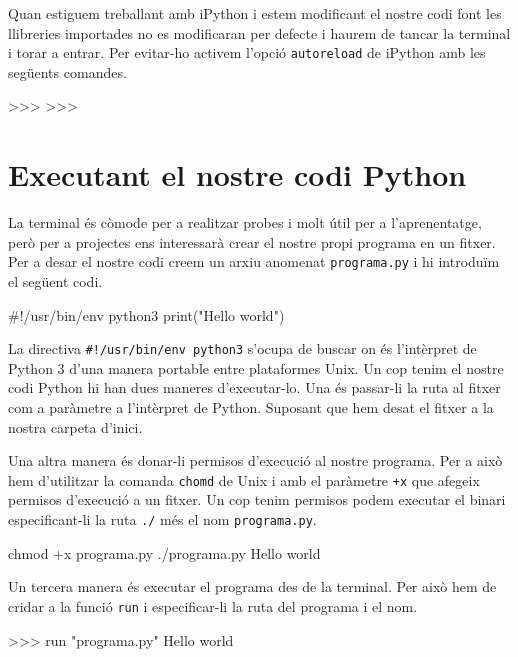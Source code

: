 Quan estiguem treballant amb iPython i estem modificant el nostre codi font les llibreries importades no es modificaran per defecte i haurem de tancar la terminal i torar a entrar. Per evitar-ho activem l'opció {\tt autoreload} de iPython amb les següents comandes.


\begin{blockcode}
>>> %
>>> %
\end{blockcode}


\section{Executant el nostre codi Python}

La terminal és còmode per a realitzar probes i molt útil per a l'aprenentatge, però per a projectes ens interessarà crear el nostre propi programa en un fitxer. Per a desar el nostre codi creem un arxiu anomenat {\tt programa.py} i hi introduïm el següent codi.

\begin{blockcode}
#!/usr/bin/env python3
print("Hello world")
\end{blockcode}


La directiva {\tt \#!/usr/bin/env python3} s'ocupa de buscar on és l'intèrpret de Python 3 d'una manera portable entre plataformes Unix. Un cop tenim el nostre codi Python hi han dues maneres d'executar-lo. Una és passar-li la ruta al fitxer com a paràmetre a l'intèrpret de Python. Suposant que hem desat el fitxer a la nostra carpeta d'inici.



Una altra manera és donar-li permisos d'execució al nostre programa. Per a això hem d'utilitzar la comanda {\tt chomd} de Unix i amb el paràmetre {\tt +x} que afegeix permisos d'execució a un fitxer. Un cop tenim permisos podem executar el binari especificant-li la ruta {\tt ./} més el nom {\tt programa.py}.

\begin{blockcode}
chmod +x programa.py
./programa.py
Hello world
\end{blockcode}

Un tercera manera és executar el programa des de la terminal. Per això hem de cridar a la funció {\tt run} i especificar-li la ruta del programa i el nom.
  
\begin{blockcode}
>>> run "programa.py"
Hello world
\end{blockcode}


